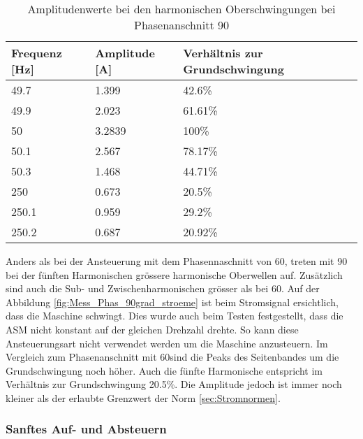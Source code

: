 \begin{table}[ht!]
	\centering
	\begin{tabular}{|l|l|l|}
		\hline
		Frequenz {[}Hz{]} & Amplitude {[}A{]} & Verhältnis zur Grundschwingung	\\ \hline
		49.7              & 1.399             & 42.6\%							\\ \hline
		49.9              & 2.023             & 61.61\%							\\ \hline
		50                & 3.2839            & 100\%							\\ \hline
		50.1              & 2.567             & 78.17\%							\\ \hline
		50.3              & 1.468             & 44.71\%							\\ \hline
		250               & 0.673             & 20.5\%							\\ \hline
		250.1             & 0.959             & 29.2\%							\\ \hline
		250.2             & 0.687             & 20.92\%							\\ \hline
	\end{tabular}
	\caption{Amplitudenwerte bei den harmonischen Oberschwingungen bei Phasenanschnitt 90\textdegree}\label{tab:Phas_90_ASM_stroeme}
\end{table}

Anders als bei der Ansteuerung mit dem Phasennaschnitt von 60\textdegree, treten mit 90\textdegree \hspace{0.02cm} bei der fünften Harmonischen grössere harmonische Oberwellen auf. Zusätzlich sind auch die Sub- und Zwischenharmonischen grösser als bei 60\textdegree. Auf der Abbildung \ref{fig:Mess_Phas_90grad_stroeme} ist beim Stromsignal ersichtlich, dass die Maschine schwingt. Dies wurde auch beim Testen festgestellt, dass die ASM nicht konstant auf der gleichen Drehzahl drehte. So kann diese Ansteuerungsart nicht verwendet werden um die Maschine anzusteuern. 
Im Vergleich zum Phasenanschnitt mit 60\textdegree sind die Peaks des Seitenbandes um die Grundschwingung noch höher. Auch die fünfte Harmonische entspricht im Verhältnis zur Grundschwingung 20.5\%. Die Amplitude jedoch ist immer noch kleiner als der erlaubte Grenzwert der Norm \ref{sec:Stromnormen}. 



\subsubsection*{Sanftes Auf- und Absteuern}

